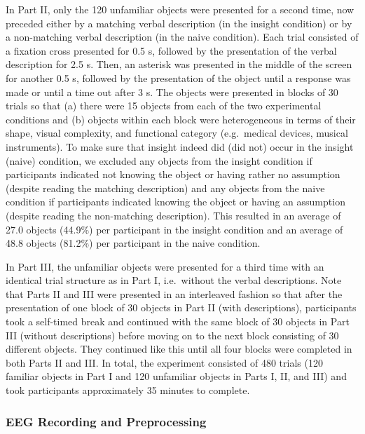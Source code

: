 \documentclass[
  english,
  man,11pt,floatsintext]{apa7}
\begin{document}
In Part II, only the 120 unfamiliar objects were presented for a second time, now preceded either by a matching verbal description (in the insight condition) or by a non-matching verbal description (in the naive condition). Each trial consisted of a fixation cross presented for 0.5 s, followed by the presentation of the verbal description for 2.5 s. Then, an asterisk was presented in the middle of the screen for another 0.5 s, followed by the presentation of the object until a response was made or until a time out after 3 s. The objects were presented in blocks of 30 trials so that (a) there were 15 objects from each of the two experimental conditions and (b) objects within each block were heterogeneous in terms of their shape, visual complexity, and functional category (e.g.~medical devices, musical instruments). To make sure that insight indeed did (did not) occur in the insight (naive) condition, we excluded any objects from the insight condition if participants indicated not knowing the object or having rather no assumption (despite reading the matching description) and any objects from the naive condition if participants indicated knowing the object or having an assumption (despite reading the non-matching description). This resulted in an average of 27.0 objects (44.9\%) per participant in the insight condition and an average of 48.8 objects (81.2\%) per participant in the naive condition.

In Part III, the unfamiliar objects were presented for a third time with an identical trial structure as in Part I, i.e.~without the verbal descriptions. Note that Parts II and III were presented in an interleaved fashion so that after the presentation of one block of 30 objects in Part II (with descriptions), participants took a self-timed break and continued with the same block of 30 objects in Part III (without descriptions) before moving on to the next block consisting of 30 different objects. They continued like this until all four blocks were completed in both Parts II and III. In total, the experiment consisted of 480 trials (120 familiar objects in Part I and 120 unfamiliar objects in Parts I, II, and III) and took participants approximately 35 minutes to complete.

\hypertarget{eeg-recording-and-preprocessing}{%
\subsubsection{EEG Recording and Preprocessing}\label{eeg-recording-and-preprocessing}}
\end{document}
